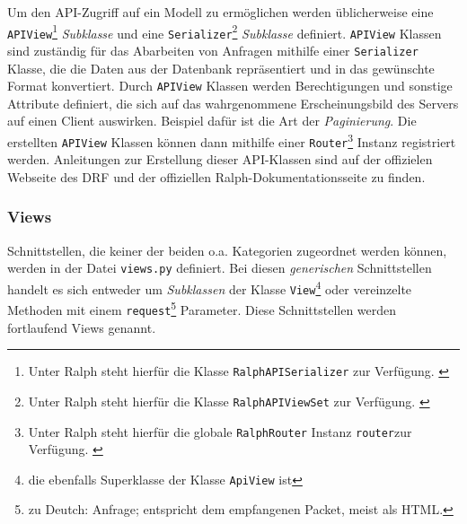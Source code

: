Um den API-Zugriff auf ein Modell zu ermöglichen werden üblicherweise
eine \texttt{APIView}\footnote{Unter Ralph steht hierfür die Klasse
  \texttt{RalphAPISerializer} zur Verfügung. \cite{ralph-api-doku}}
\emph{Subklasse}
und eine \texttt{Serializer}\footnote{Unter Ralph steht hierfür die
  Klasse \texttt{RalphAPIViewSet} zur Verfügung. \cite{ralph-api-doku}}
\emph{Subklasse}
definiert. \texttt{APIView} Klassen sind zuständig für das Abarbeiten
von Anfragen mithilfe einer \texttt{Serializer} Klasse, die die Daten
aus der Datenbank repräsentiert und in das gewünschte Format
konvertiert. Durch \texttt{APIView} Klassen werden Berechtigungen und
sonstige Attribute definiert, die sich auf das wahrgenommene
Erscheinungsbild des Servers auf einen Client auswirken. Beispiel dafür
ist die Art der
\emph{Paginierung}\cite{django-rest-framework}.
Die erstellten \texttt{APIView} Klassen können dann mithilfe einer
\texttt{Router}\footnote{Unter Ralph steht hierfür die globale
  \texttt{RalphRouter} Instanz \texttt{router}zur Verfügung.
  \cite{ralph-api-doku}} Instanz registriert werden. Anleitungen zur
Erstellung dieser API-Klassen sind auf der offizielen Webseite des DRF
\cite{django-rest-framework} und der offiziellen
Ralph-Dokumentationsseite \cite{ralph-api-doku} zu finden.

\hypertarget{views}{%
\subsubsection{Views}\label{views}}

Schnittstellen, die keiner der beiden o.a. Kategorien zugeordnet werden
können, werden in der Datei \texttt{views.py} definiert. Bei diesen
\emph{generischen}
Schnittstellen handelt es sich entweder um
\emph{Subklassen}
der Klasse \texttt{View}\footnote{die ebenfalls Superklasse der Klasse
  \texttt{ApiView} ist} \cite{django-doku-class-based-views} oder
vereinzelte Methoden mit einem \texttt{request}\footnote{zu Deutch:
  Anfrage; entspricht dem empfangenen Packet, meist als HTML.}
Parameter. \cite{django-doku-views} Diese Schnittstellen werden
fortlaufend Views genannt.


